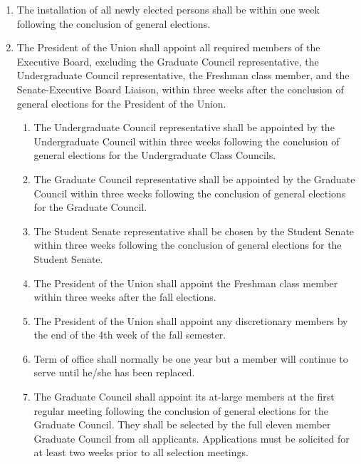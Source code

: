 \documentclass{uniondoc}
\begin{document}
\begin{enumerate}
	\item The installation of all newly elected persons shall be within one week following the conclusion of general elections.
	\item The President of the Union shall appoint all required members of the Executive Board, excluding the Graduate Council representative, the Undergraduate Council representative, the Freshman class member, and the Senate-Executive Board Liaison, within three weeks after the conclusion of general elections for the President of the Union.
	      \begin{enumerate}
		      \item The Undergraduate Council representative shall be appointed by the Undergraduate Council within three weeks following the conclusion of general elections for the Undergraduate Class Councils.
		      \item The Graduate Council representative shall be appointed by the Graduate Council within three weeks following the conclusion of general elections for the Graduate Council.
		      \item The Student Senate representative shall be chosen by the Student Senate within three weeks following the conclusion of general elections for the Student Senate.
		      \item The President of the Union shall appoint the Freshman class member within three weeks after the fall elections.
		      \item The President of the Union shall appoint any discretionary members by the end of the 4th week of the fall semester.
		      \item Term of office shall normally be one year but a member will continue to serve until he/she has been replaced.
		      \item The Graduate Council shall appoint its at-large members at the first regular meeting following the conclusion of general elections for the Graduate Council. They shall be selected by the full eleven member Graduate Council from all applicants. Applications must be solicited for at least two weeks prior to all selection meetings.
	      \end{enumerate}
\end{enumerate}

\section{}
\end{document}
